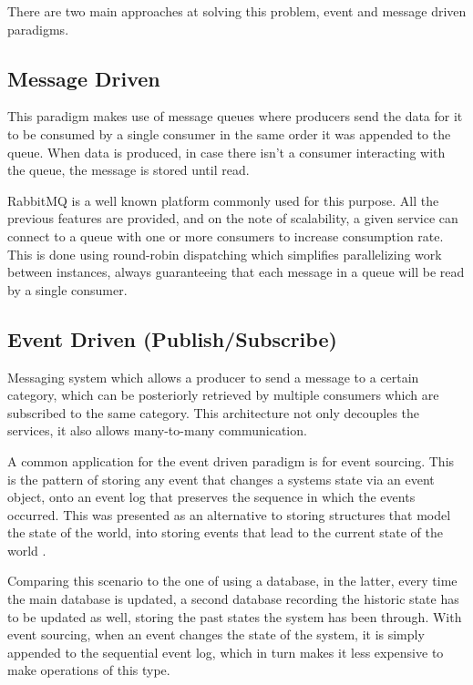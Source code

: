 There are two main approaches at solving this problem, event and message driven paradigms.

\subsection{Message Driven}

This paradigm makes use of message queues where producers send the data for it to be consumed by a single consumer in the same order it was appended to the queue. When data is produced, in case there isn’t a consumer interacting with the queue, the message is stored until read. 

RabbitMQ is a well known platform commonly used for this purpose. All the previous features are provided, and on the note of scalability, a given service can connect to a queue with one or more consumers to increase consumption rate. This is done using round-robin dispatching \cite{RabbitMQscale} which simplifies parallelizing work between instances, always guaranteeing that each message in a queue will be read by a single consumer.

\subsection{Event Driven (Publish/Subscribe)}

Messaging system which allows a producer to send a message to a certain category, which can be posteriorly retrieved by multiple consumers which are subscribed to the same category. This architecture not only decouples the services, it also allows many-to-many communication.

A common application for the event driven paradigm is for event sourcing. This is the pattern of storing any event that changes a systems state via an event object, onto an event log that preserves the sequence in which the events occurred. This was presented as an alternative to storing structures that model the state of the world, into storing events that lead to the current state of the world \cite[Chapter~5]{nadareishvili2016microservice}.

Comparing this scenario to the one of using a database, in the latter, every time the main database is updated, a second database recording the historic state has to be updated as well, storing the past states the system has been through. With event sourcing, when an event changes the state of the system, it is simply appended to the sequential event log, which in turn makes it less expensive to make operations of this type.

